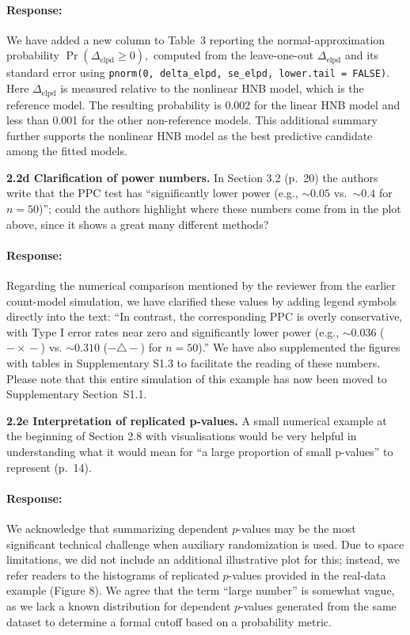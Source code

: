 \documentclass[11pt]{article}
\newcommand*{\mybox}[2]{%
  \par\medskip\noindent
  \colorbox{#1!30}{\parbox{.98\linewidth}{#2}}%
  \par\medskip
}
\begin{document}
\paragraph{Response:}
We have added a new column to Table~3 reporting the normal-approximation probability $\Pr(\Delta_{\mathrm{elpd}} \ge 0),$ computed from the leave-one-out $\Delta_{\mathrm{elpd}}$ and its standard error using \texttt{pnorm(0, delta\_elpd, se\_elpd, lower.tail = FALSE)}. Here $\Delta_{\mathrm{elpd}}$ is measured relative to the nonlinear HNB model, which is the reference model. The resulting probability is 0.002 for the linear HNB model and less than 0.001 for the other non-reference models. This additional summary further supports the nonlinear HNB model as the best predictive candidate among the fitted models.


\mybox{gray}{\textbf{2.2d Clarification of power numbers.} In Section 3.2 (p.~20) the authors write that the PPC test has ``significantly lower power (e.g., $\sim 0.05$ vs.\ $\sim 0.4$ for $n=50$)''; could the authors highlight where these numbers come from in the plot above, since it shows a great many different methods?}

\paragraph{Response:}
Regarding the numerical comparison mentioned by the reviewer from the earlier count-model simulation, we have clarified these values by adding legend symbols directly into the text: ``In contrast, the corresponding PPC is overly conservative, with Type I error rates near zero and significantly lower power (e.g., $\sim 0.036$ ($-\!\times\!-$) vs. $\sim 0.310$ ($-\!\triangle\!-$) for $n=50$).''  We have also supplemented the figures with tables in Supplementary S1.3 to facilitate the reading of these numbers. Please note that this entire simulation of this example has now been moved to Supplementary Section~S1.1.


\mybox{gray}{\textbf{2.2e Interpretation of replicated p-values.} A small numerical example at the beginning of Section 2.8 with visualisations would be very helpful in understanding what it would mean for ``a large proportion of small p-values'' to represent (p.~14).}

\paragraph{Response:}
We acknowledge that summarizing dependent $p$-values may be the most significant technical challenge when auxiliary randomization is used. Due to space limitations, we did not include an additional illustrative plot for this; instead, we refer readers to the histograms of replicated $p$-values provided in the real-data example (Figure 8). We agree that the term ``large number'' is somewhat vague, as we lack a known distribution for dependent $p$-values generated from the same dataset to determine a formal cutoff based on a probability metric. 
\end{document}
